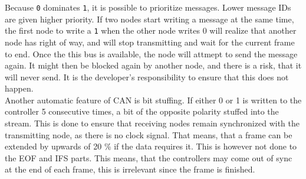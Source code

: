 Because \texttt{0} dominates \texttt{1}, it is possible to prioritize messages.
Lower message IDs are given higher priority.
If two nodes start writing a message at the same time, the first node to write a \texttt{1} when the other node writes 0 will realize that another node has right of way, and will stop transmitting and wait for the current frame to end.
Once the this bus is available, the node will attmept to send the message again.
It might then be blocked again by another node, and there is a risk, that it will never send.
It is the developer's responsibility to ensure that this does not happen.\\

Another automatic feature of CAN is bit stuffing.
If either 0 or 1 is written to the controller 5 consecutive times, a bit of the opposite polarity stuffed into the stream. 
This is done to ensure that receiving nodes remain synchronized with the transmitting node, as there is no clock signal.
That means, that a frame can be extended by upwards of 20 \% if the data requires it.
This is however not done to the EOF and IFS parts.
This means, that the controllers may come out of sync at the end of each frame, this is irrelevant since the frame is finished.
